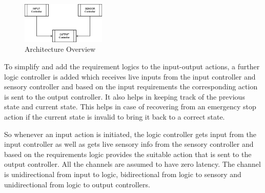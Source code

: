 \begin{figure}[htp]
    \centering
    \includegraphics[width=4cm]{chapters/images/Architecture.png}
    \caption{Architecture Overview}
    \label{fig:architecture}
\end{figure}

To simplify and add the requirement logics to the input-output actions, a further logic controller is added which receives live inputs from the input controller and sensory controller and based on the input requirements the corresponding action is sent to the output controller. It also helps in keeping track of the previous state and current state. This helps in case of recovering from an emergency stop action if the current state is invalid to bring it back to a correct state.

So whenever an input action is initiated, the logic controller gets input from the input controller as well as gets live sensory info from the sensory controller and based on the requirements logic provides the suitable action that is sent to the output controller. All the channels are assumed to have zero latency. The channel is unidirectional from input to logic, bidirectional from logic to sensory and unidirectional from logic to output controllers.
